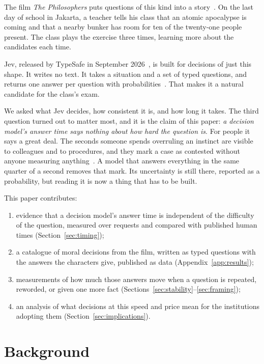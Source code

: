 \documentclass[journal]{IEEEtran}
\begin{document}
The film \emph{The Philosophers} puts questions of this kind into a
story~\cite{huddles2013,wikipedia_afterdark}. On the last day of school in Jakarta, a teacher tells
his class that an atomic apocalypse is coming and that a nearby bunker has room for ten of the
twenty-one people present. The class plays the exercise three times, learning more about the
candidates each time.

Jev, released by TypeSafe in September 2026~\cite{openrouter_model}, is built for decisions of
just this shape. It writes no text. It takes a situation and a set of typed questions, and returns
one answer per question with probabilities~\cite{typesafe_blog,typesafe_systemone}. That makes it a
natural candidate for the class's exam.

We asked what Jev decides, how consistent it is, and how long it takes. The third question turned
out to matter most, and it is the claim of this paper: \emph{a decision model's answer time says
nothing about how hard the question is}. For people it says a great deal. The seconds someone
spends overruling an instinct are visible to colleagues and to procedures, and they mark a case as
contested without anyone measuring anything~\cite{greene2001}. A model that answers everything in
the same quarter of a second removes that mark. Its uncertainty is still there, reported as a
probability, but reading it is now a thing that has to be built.

This paper contributes:
\begin{enumerate}[label=(\arabic*),leftmargin=1.6em]
  \item evidence that a decision model's answer time is independent of the difficulty of the
    question, measured over \NRequests{} requests and compared with published human times
    (Section~\ref{sec:timing});
  \item a catalogue of \NQuestionIds{} moral decisions from the film, written as typed questions
    with the answers the characters give, published as data (Appendix~\ref{app:results});
  \item measurements of how much those answers move when a question is repeated, reworded, or
    given one more fact (Sections~\ref{sec:stability}--\ref{sec:framing});
  \item an analysis of what decisions at this speed and price mean for the institutions adopting
    them (Section~\ref{sec:implications}).
\end{enumerate}


\section{Background}
\end{document}
